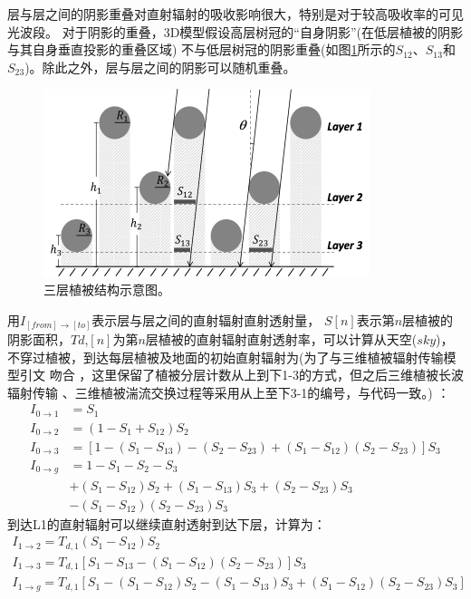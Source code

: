 层与层之间的阴影重叠对直射辐射的吸收影响很大，特别是对于较高吸收率的可见光波段。
对于阴影的重叠，3D模型假设高层树冠的“自身阴影”(在低层植被的阴影与其自身垂直投影的重叠区域)
不与低层树冠的阴影重叠(如图\ref{fig:三层植被结构示意图}所示的$S_{12}$、$S_{13}$和$S_{23}$)。除此之外，层与层之间的阴影可以随机重叠。
{
\begin{figure}[]
\centering
\includegraphics{Figures/辐射过程及辐射通量计算/三层植被结构示意图.png}
\caption{三层植被结构示意图。}
\label{fig:三层植被结构示意图}
\end{figure}
}
用$I_{\left[from\right]\rightarrow\left[to\right]}$表示层与层之间的直射辐射直射透射量，
$S[n]$表示第$n$层植被的阴影面积，$Td$,$[n]$为第$n$层植被的直射辐射直射透射率，可以计算从天空($sky$)，
不穿过植被，到达每层植被及地面的初始直射辐射为(为了与三维植被辐射传输模型引文 \citep{yuan20143d} 吻合
，这里保留了植被分层计数从上到下1-3的方式，但之后三维植被长波辐射传输
、三维植被湍流交换过程等采用从上至下3-1的编号，与代码一致。) ：
\begin{equation}
\begin{aligned} I_{0 \rightarrow 1} &=S_{1} \\ I_{0 \rightarrow 2} &=\left(1-S_{1}+S_{12}\right) S_{2} \\ 
    I_{0 \rightarrow 3} &=\left[1-\left(S_{1}-S_{13}\right)-\left(S_{2}-S_{23}\right)+\left(S_{1}-S_{12}\right)\left(S_{2}-S_{23}\right)\right] S_{3} \\ 
    I_{0 \rightarrow g} &=1-S_{1}-S_{2}-S_{3} \\ &+\left(S_{1}-S_{12}\right) S_{2}+\left(S_{1}-S_{13}\right) S_{3}+\left(S_{2}-S_{23}\right) S_{3} \\
     &-\left(S_{1}-S_{12}\right)\left(S_{2}-S_{23}\right) S_{3} \end{aligned}
\end{equation}
到达L1的直射辐射可以继续直射透射到达下层，计算为：
\begin{equation}
\begin{array}{l}I_{1 \rightarrow 2}=T_{d, 1}\left(S_{1}-S_{12}\right) S_{2} \\
     I_{1 \rightarrow 3}=T_{d, 1}\left[S_{1}-S_{13}-\left(S_{1}-S_{12}\right)\left(S_{2}-S_{23}\right)\right] S_{3} \\
      I_{1 \rightarrow g}=T_{d, 1}\left[S_{1}-\left(S_{1}-S_{12}\right) S_{2}-\left(S_{1}-S_{13}\right) S_{3}+\left(S_{1}-S_{12}\right)\left(S_{2}-S_{23}\right) S_{3}\right]\end{array}
\end{equation}
